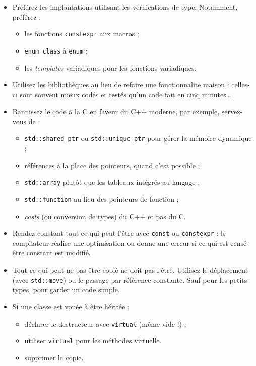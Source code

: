 \documentclass[12pt,a4paper]{article}
\newcommand{\flenglish}[1]{\emph{\foreignlanguage{english}{#1}}}
\begin{document}
\begin{itemize}
\item Préférez les implantations utilisant les vérifications de type. Notamment, préférez :
	\begin{itemize}
	\item les fonctions \lstinline|constexpr| aux macros ;
	\item \lstinline|enum class| à \lstinline|enum| ;
	\item les \flenglish{templates} variadiques pour les fonctions variadiques.
	\end{itemize}
\item Utilisez les bibliothèques au lieu de refaire une fonctionnalité \og maison \fg{} : celles-ci sont souvent mieux codés et testés qu'un code fait en cinq minutes\dots{}
\item Bannissez le code \og à la C \fg{} en faveur du C++ moderne, par exemple, servez-vous de :
	\begin{itemize}
	\item \lstinline|std::shared_ptr| ou \lstinline|std::unique_ptr| pour gérer la mémoire dynamique ;
	\item références à la place des pointeurs, quand c'est possible ;
	\item \lstinline|std::array| plutôt que les tableaux intégrés au langage ;
	\item \lstinline|std::function| au lieu des pointeurs de fonction ;
	\item \flenglish{casts} (ou conversion de types) du C++ et pas du C.
	\end{itemize}
\item Rendez constant tout ce qui peut l'être avec \lstinline|const| ou \lstinline|constexpr| : le compilateur réalise une optimisation ou donne une erreur si ce qui est censé être constant est modifié.
\item Tout ce qui peut ne pas être copié ne doit pas l'être. Utilisez le déplacement (avec \lstinline|std::move|) ou le passage par référence constante. Sauf pour les \og petits \fg{} types, pour garder un code simple.
\item Si une classe est vouée à être héritée :
	\begin{itemize}
	\item déclarer le destructeur avec \lstinline|virtual| (même vide !) ;
	\item utiliser \lstinline|virtual| pour les méthodes virtuelle.
	\item supprimer la copie.
	\end{itemize}

\end{itemize}
\end{document}
